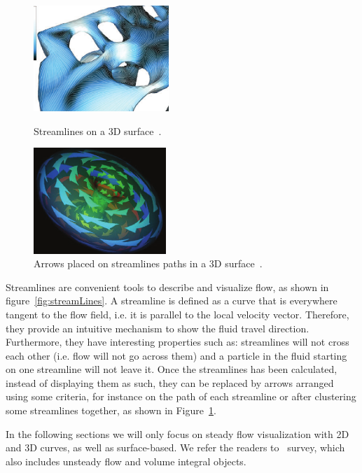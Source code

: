 \begin{figure}[htbp]
	\centering
	\begin{minipage}[t]{.45\textwidth}
		\centering
		\includegraphics[width=.8\textwidth,height=4cm]{images/streamLinesSpencer}
		\caption{Streamlines on a 3D surface~\cite{Spencer2009}.}
		\label{fig:streamLines}
	\end{minipage}\hfill
	\begin{minipage}[t]{.45\textwidth}
		\centering
		\includegraphics[width=.8\textwidth,height=4cm]{images/streamArrows}
		\caption{Arrows placed on streamlines paths in a 3D surface~\cite{loffelmann1998}.}
		\label{fig:streamArrows}
	\end{minipage}
\end{figure}

Streamlines are convenient tools to describe and visualize flow, as shown in figure~\ref{fig:streamLines}.
A streamline is defined as a curve that is everywhere tangent to the flow field, i.e. it is parallel to the local velocity vector.
Therefore, they provide an intuitive mechanism to show the fluid travel direction.
Furthermore, they have interesting properties such as: streamlines will not cross each other (i.e. flow will not go across them) and a particle in the fluid starting on one streamline will not leave it.
Once the streamlines has been calculated, instead of displaying them as such, they can be replaced by arrows arranged using some criteria, for instance on the path of each streamline or after clustering some streamlines together, as shown in Figure~\ref{fig:streamArrows}.

In the following sections we will only focus on steady flow visualization with 2D and 3D curves, as well as surface-based.
We refer the readers to~\cite{McLoughlin2010} survey, which also includes unsteady flow and volume integral objects.

